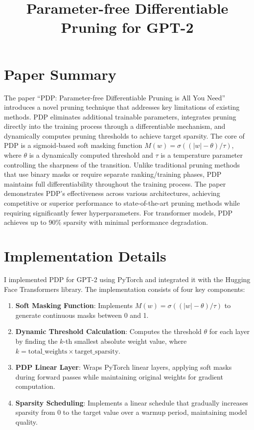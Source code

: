 \documentclass[11pt,letterpaper]{article}
\title{\textbf{Parameter-free Differentiable Pruning for GPT-2}}
\author{}
\date{}
\begin{document}
\maketitle
\vspace{-1cm}

\section*{Paper Summary}
The paper ``PDP: Parameter-free Differentiable Pruning is All You Need'' introduces a novel pruning technique that addresses key limitations of existing methods. PDP eliminates additional trainable parameters, integrates pruning directly into the training process through a differentiable mechanism, and dynamically computes pruning thresholds to achieve target sparsity. The core of PDP is a sigmoid-based soft masking function $M(w) = \sigma((|w| - \theta) / \tau)$, where $\theta$ is a dynamically computed threshold and $\tau$ is a temperature parameter controlling the sharpness of the transition. Unlike traditional pruning methods that use binary masks or require separate ranking/training phases, PDP maintains full differentiability throughout the training process. The paper demonstrates PDP's effectiveness across various architectures, achieving competitive or superior performance to state-of-the-art pruning methods while requiring significantly fewer hyperparameters. For transformer models, PDP achieves up to 90\% sparsity with minimal performance degradation.

\section*{Implementation Details}
I implemented PDP for GPT-2 using PyTorch and integrated it with the Hugging Face Transformers library. The implementation consists of four key components:

\begin{enumerate}[leftmargin=*,nosep]
    \item \textbf{Soft Masking Function}: Implements $M(w) = \sigma((|w| - \theta) / \tau)$ to generate continuous masks between 0 and 1.
    \item \textbf{Dynamic Threshold Calculation}: Computes the threshold $\theta$ for each layer by finding the $k$-th smallest absolute weight value, where $k = \text{total\_weights} \times \text{target\_sparsity}$.
    \item \textbf{PDP Linear Layer}: Wraps PyTorch linear layers, applying soft masks during forward passes while maintaining original weights for gradient computation.
    \item \textbf{Sparsity Scheduling}: Implements a linear schedule that gradually increases sparsity from 0 to the target value over a warmup period, maintaining model quality.
\end{enumerate}
\end{document}
